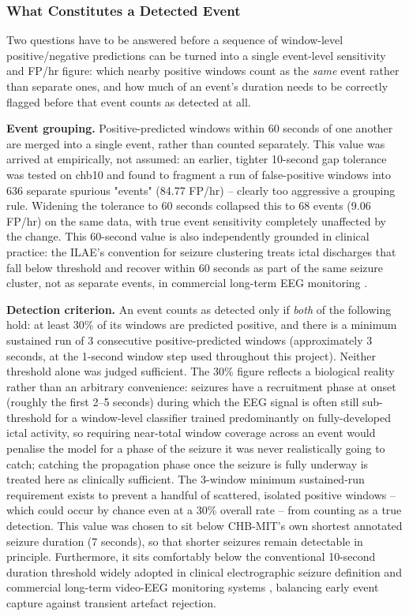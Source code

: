 \subsubsection{What Constitutes a Detected Event}

Two questions have to be answered before a sequence of window-level positive/negative predictions can be turned into a single event-level sensitivity and FP/hr figure: which nearby 
positive windows count as the \emph{same} event rather than separate ones, and how much of an event's duration needs to be correctly flagged before that event counts as detected at all.

\textbf{Event grouping.} Positive-predicted windows within 60 seconds of one another are merged into a single event, rather than counted separately. This value was arrived at empirically, not assumed: an earlier, tighter 10-second gap tolerance was tested on chb10 and found to fragment a run of false-positive windows into 636 separate spurious "events" (84.77 FP/hr) -- clearly too aggressive a grouping rule. Widening the tolerance to 60 seconds collapsed this to 68 events (9.06 FP/hr) on the same data, with true event sensitivity completely unaffected by the change. This 60-second value is also independently grounded in clinical practice: the ILAE's convention for seizure clustering treats ictal discharges that fall below threshold and recover within 60 seconds as part of the same seizure cluster, not as separate events, in commercial long-term EEG monitoring \citep{fisher2014}.

\textbf{Detection criterion.} An event counts as detected only if \emph{both} of the following hold: at least 30\% of its windows are predicted positive, and there is a minimum sustained run of 3 consecutive positive-predicted windows (approximately 3 seconds, at the 1-second window step used throughout this project). Neither threshold alone was judged sufficient. The 30\% figure reflects a biological reality rather than an arbitrary convenience: seizures have a recruitment phase at onset (roughly the first 2--5 seconds) during which the EEG signal is often still sub-threshold for a window-level classifier trained predominantly on fully-developed ictal activity, so requiring near-total window coverage across an event would penalise the model for a phase of the seizure it was never realistically going to catch; catching the propagation phase once the seizure is fully underway is treated here as clinically sufficient. The 3-window minimum sustained-run requirement exists to prevent a handful of scattered, isolated positive windows -- which could occur by chance even at a 30\% overall rate -- from counting as a true detection. This value was chosen to sit below CHB-MIT's own shortest annotated seizure duration (7 seconds), so that shorter seizures remain detectable in principle. Furthermore, it sits comfortably below the conventional 10-second duration threshold widely adopted in clinical electrographic seizure definition and commercial long-term video-EEG monitoring systems \citep{tatum2022}, balancing early event capture against transient artefact rejection.

